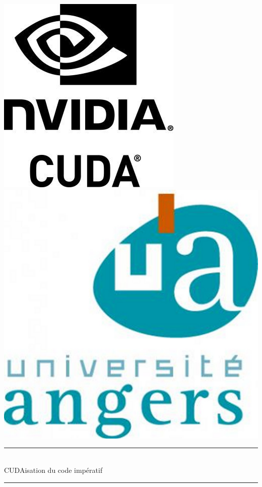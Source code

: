 \documentclass{article}
\begin{document}
	\begin{titlepage}
		\begin{center}
		
			\includegraphics[scale=0.4]{cuda_logo.jpg}
			\hspace*{3in}
			\includegraphics[scale=0.08]{angers.jpg}
			\\[4cm]
			\begin{Huge}
				\rule{\linewidth}{0.5mm} \\[0.4cm]
				CUDAisation du code impératif
				\rule{\linewidth}{0.5mm} \\[0.3cm]
				

\end{Huge}
\end{center}
\end{titlepage}
\end{document}
